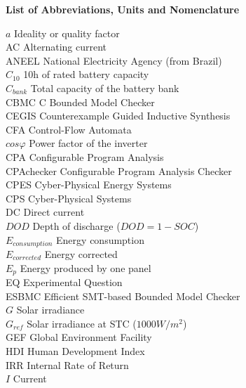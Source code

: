 \thispagestyle{plain}
\begin{center}
%    
%    
%    
    \vspace{0.9cm}
    \textbf{List of Abbreviations, Units and Nomenclature}
\end{center}

\noindent $a$ Ideality or quality factor \\
AC Alternating current \\
ANEEL National Electricity Agency (from Brazil) \\
$C_{10}$ 10h of rated battery capacity \\
$C_{bank}$ Total capacity of the battery bank \\
CBMC C Bounded Model Checker \\
CEGIS Counterexample Guided Inductive Synthesis \\
CFA Control-Flow Automata \\
$ cos \varphi $ Power factor of the inverter \\
CPA Configurable Program Analysis \\
CPAchecker Configurable Program Analysis Checker \\
CPES Cyber-Physical Energy Systems \\
CPS Cyber-Physical Systems \\
DC Direct current \\
$DOD$ Depth of discharge ($DOD=1-SOC$) \\
$E_{consumption}$ Energy consumption \\
$E_{corrected}$ Energy corrected \\
$E_{p}$ Energy produced by one panel \\
EQ Experimental Question \\
ESBMC Efficient SMT-based Bounded Model Checker \\
$G$ Solar irradiance \\
$ G_{ref} $ Solar irradiance at STC ($1000 W/m^{2}$) \\
GEF Global Environment Facility \\
HDI Human Development Index \\
IRR  Internal Rate of Return \\
$I$ Current \\
